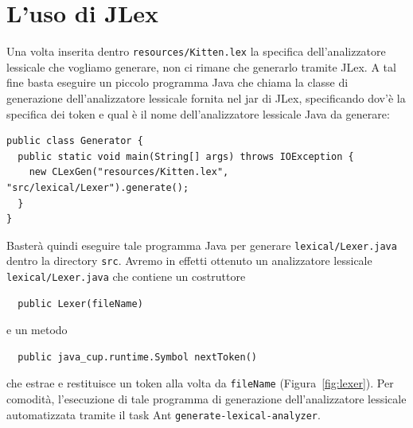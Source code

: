 \section{L'uso di JLex}\label{sec:use_jlex}
%
Una volta inserita dentro \texttt{resources/Kitten.lex} la specifica
dell'analizzatore lessicale che vogliamo generare, non ci rimane
che generarlo tramite JLex. A tal fine basta eseguire un piccolo programma
Java che chiama la classe di generazione dell'analizzatore lessicale
fornita nel jar di JLex, specificando dov'\`e la specifica dei token e qual \`e
il nome dell'analizzatore lessicale Java da generare:
%
\begin{verbatim}
public class Generator {
  public static void main(String[] args) throws IOException {
    new CLexGen("resources/Kitten.lex", "src/lexical/Lexer").generate();
  }
}
\end{verbatim}
%
Baster\`a quindi eseguire tale programma Java per generare \texttt{lexical/Lexer.java}
dentro la directory \texttt{src}. Avremo in effetti ottenuto un analizzatore lessicale
\texttt{lexical/Lexer.java} che contiene un costruttore
%
\begin{verbatim}
  public Lexer(fileName)
\end{verbatim}
%
e un metodo
%
\begin{verbatim}
  public java_cup.runtime.Symbol nextToken()
\end{verbatim}
%
che estrae e restituisce un token alla volta da \texttt{fileName} (Figura~\ref{fig:lexer}).
Per comodit\`a, l'esecuzione
di tale programma di generazione dell'analizzatore lessicale \e automatizzata
tramite il task Ant \texttt{generate-lexical-analyzer}.

